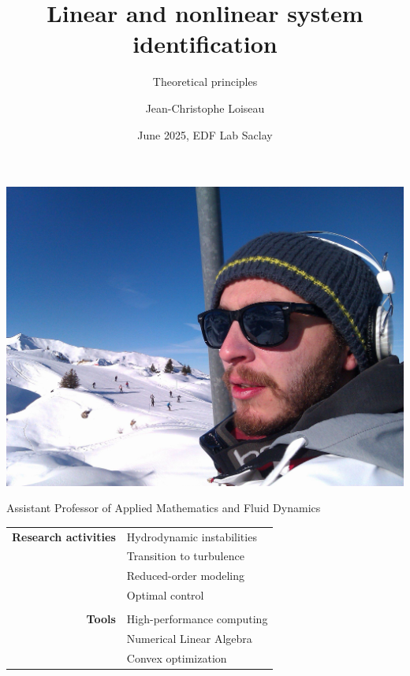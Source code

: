 \documentclass[aspectratio=169,compress,12pt,dvipsnames]{beamer}
\title{Linear and nonlinear system identification}
\subtitle{Theoretical principles}
\date{June 2025, EDF Lab Saclay}
\author{Jean-Christophe Loiseau}
\begin{document}
\frame[plain]{\titlepage}


\begin{frame}
    \vfill
    \begin{minipage}{.28\textwidth}
        \centering
        \includegraphics[width=\textwidth]{myself.jpg}  \\
        \par\bigskip
        \tiny
        Assistant Professor of Applied Mathematics and Fluid Dynamics
    \end{minipage}%
    \hfill
    \begin{minipage}{.68\textwidth}
        \centering
        \begin{tabular}{rl}
            \textbf{Research activities}    &   Hydrodynamic instabilities  \\
                                            &   Transition to turbulence    \\
                                            &   Reduced-order modeling      \\
                                            &   Optimal control             \\
                                                                            \\
            \textbf{Tools}                  &   High-performance computing  \\
                                            &   Numerical Linear Algebra    \\
                                            &   Convex optimization
        \end{tabular}
    \end{minipage}
    \vfill
\end{frame}
\end{document}
